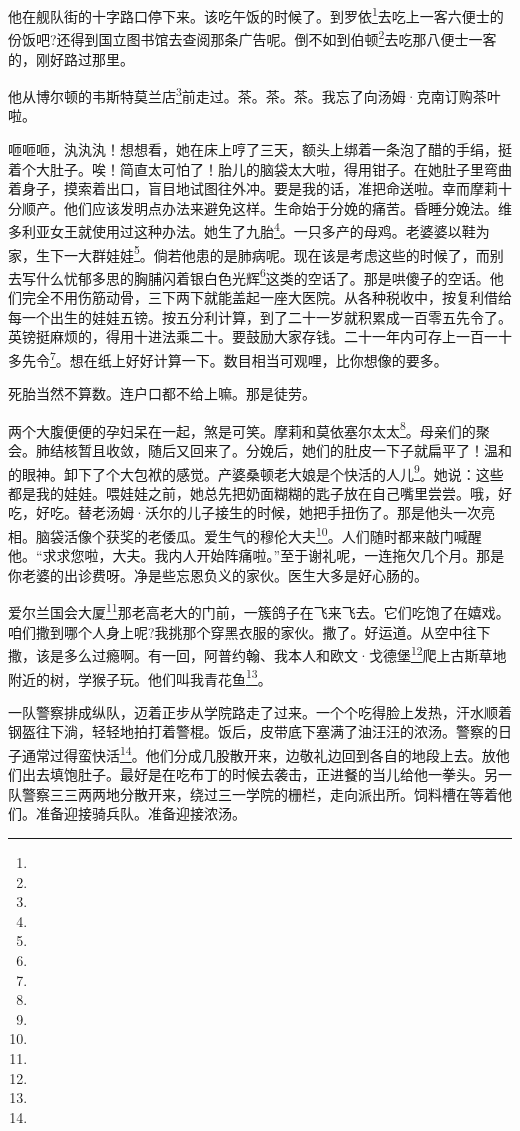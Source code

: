 \par 他在舰队街的十字路口停下来。该吃午饭的时候了。到罗依\footnote{}去吃上一客六便士的份饭吧?还得到国立图书馆去查阅那条广告呢。倒不如到伯顿\footnote{}去吃那八便士一客的，刚好路过那里。
\par 他从博尔顿的韦斯特莫兰店\footnote{}前走过。茶。茶。茶。我忘了向汤姆·克南订购茶叶啦。
\par 咂咂咂，汍汍汍！想想看，她在床上哼了三天，额头上绑着一条泡了醋的手绢，挺着个大肚子。唉！简直太可怕了！胎儿的脑袋太大啦，得用钳子。在她肚子里弯曲着身子，摸索着出口，盲目地试图往外冲。要是我的话，准把命送啦。幸而摩莉十分顺产。他们应该发明点办法来避免这样。生命始于分娩的痛苦。昏睡分娩法。维多利亚女王就使用过这种办法。她生了九胎\footnote{}。一只多产的母鸡。老婆婆以鞋为家，生下一大群娃娃\footnote{}。倘若他患的是肺病呢。现在该是考虑这些的时候了，而别去写什么忧郁多思的胸脯闪着银白色光辉\footnote{}这类的空话了。那是哄傻子的空话。他们完全不用伤筋动骨，三下两下就能盖起一座大医院。从各种税收中，按复利借给每一个出生的娃娃五镑。按五分利计算，到了二十一岁就积累成一百零五先令了。英镑挺麻烦的，得用十进法乘二十。要鼓励大家存钱。二十一年内可存上一百一十多先令\footnote{}。想在纸上好好计算一下。数目相当可观哩，比你想像的要多。
\par 死胎当然不算数。连户口都不给上嘛。那是徒劳。
\par 两个大腹便便的孕妇呆在一起，煞是可笑。摩莉和莫依塞尔太太\footnote{}。母亲们的聚会。肺结核暂且收敛，随后又回来了。分娩后，她们的肚皮一下子就扁平了！温和的眼神。卸下了个大包袱的感觉。产婆桑顿老大娘是个快活的人儿\footnote{}。她说：这些都是我的娃娃。喂娃娃之前，她总先把奶面糊糊的匙子放在自己嘴里尝尝。哦，好吃，好吃。替老汤姆·沃尔的儿子接生的时候，她把手扭伤了。那是他头一次亮相。脑袋活像个获奖的老倭瓜。爱生气的穆伦大夫\footnote{}。人们随时都来敲门喊醒他。“求求您啦，大夫。我内人开始阵痛啦。”至于谢礼呢，一连拖欠几个月。那是你老婆的出诊费呀。净是些忘恩负义的家伙。医生大多是好心肠的。
\par 爱尔兰国会大厦\footnote{}那老高老大的门前，一簇鸽子在飞来飞去。它们吃饱了在嬉戏。咱们撒到哪个人身上呢?我挑那个穿黑衣服的家伙。撒了。好运道。从空中往下撒，该是多么过瘾啊。有一回，阿普约翰、我本人和欧文·戈德堡\footnote{}爬上古斯草地附近的树，学猴子玩。他们叫我青花鱼\footnote{}。
\par 一队警察排成纵队，迈着正步从学院路走了过来。一个个吃得脸上发热，汗水顺着钢盔往下淌，轻轻地拍打着警棍。饭后，皮带底下塞满了油汪汪的浓汤。警察的日子通常过得蛮快活\footnote{}。他们分成几股散开来，边敬礼边回到各自的地段上去。放他们出去填饱肚子。最好是在吃布丁的时候去袭击，正进餐的当儿给他一拳头。另一队警察三三两两地分散开来，绕过三一学院的栅栏，走向派出所。饲料槽在等着他们。准备迎接骑兵队。准备迎接浓汤。

